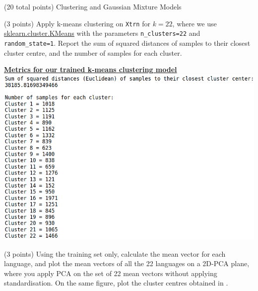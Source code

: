 \documentclass[12pt]{article}
\begin{document}
\clearpage
%
%

\begin{question}{(20 total points) Clustering and Gaussian Mixture Models}  


  


  \medskip
   \begin{subquestion}{(3 points)
       Apply k-means clustering on {\tt Xtrn} for $k = 22$, where we use
       \href{https://scikit-learn.org/0.19/modules/generated/sklearn.cluster.KMeans.html}{sklearn.cluster.KMeans}
       with the parameters {\tt n\_clusters=22} and {\tt random\_state=1}.
       Report the sum of squared distances of samples to their closest
       cluster centre, and the number of samples for each cluster.
     } \label{Q3.1}
   

      \begin{answerbox}{35em}
        \textbf{\large{\underline{Metrics for our trained k-means clustering model}}}
        \vspace{0.3cm}\\
         \includegraphics[width=1\textwidth]{images/q31.png}
      \end{answerbox}
  


   \end{subquestion}
   \begin{subquestion}{(3 points)
       Using the training set only,
       calculate the mean vector for each language, and plot the mean
       vectors of all the 22 languages on a 2D-PCA plane, where you
       apply PCA on the set of 22 mean vectors without applying
       standardisation.  
       On the same figure, plot the cluster centres obtained in .
     } \label{Q3.2}


\end{subquestion}
\end{question}
\end{document}
